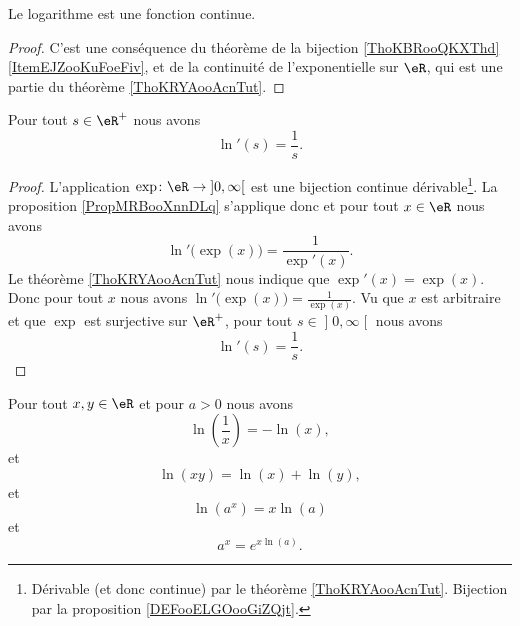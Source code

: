 \begin{lemma}        \label{LEMooCYGTooEjXEUu}
	Le logarithme est une fonction continue.
\end{lemma}

\begin{proof}
	C'est une conséquence du théorème de la bijection \ref{ThoKBRooQKXThd}\ref{ItemEJZooKuFoeFiv}, et de la continuité de l'exponentielle sur \( \eR\), qui est une partie du théorème \ref{ThoKRYAooAcnTut}.
\end{proof}

\begin{proposition}      \label{PROPooPDJLooXphpEM}
	Pour tout \( s\in \eR^+\) nous avons
	\begin{equation}
		\ln'(s)=\frac{1}{ s }.
	\end{equation}
\end{proposition}

\begin{proof}
	L'application \( \exp\colon \eR\to \mathopen] 0 , \infty \mathclose[\) est une bijection continue dérivable\footnote{Dérivable (et donc continue) par le théorème \ref{ThoKRYAooAcnTut}. Bijection par la proposition \ref{DEFooELGOooGiZQjt}.}. La proposition \ref{PropMRBooXnnDLq} s'applique donc et pour tout \( x\in \eR\) nous avons
		\begin{equation}
			\ln'\big( \exp(x) \big)=\frac{1}{ \exp'(x) }.
		\end{equation}
		Le théorème \ref{ThoKRYAooAcnTut} nous indique que \( \exp'(x)=\exp(x)\). Donc pour tout \( x\) nous avons \( \ln'\big( \exp(x) \big)=\frac{1}{  \exp(x) }\). Vu que \( x\) est arbitraire et que \( \exp\) est surjective sur \( \eR^+\), pour tout \( s\in \mathopen] 0 , \infty \mathclose[\) nous avons
	\begin{equation}
		\ln'(s)=\frac{1}{ s }.
	\end{equation}
\end{proof}

\begin{proposition}      \label{PROPooLAOWooEYvXmI}
	Pour tout \( x,y\in \eR\) et pour \( a>0\) nous avons
	\begin{equation}
		\ln(\frac{1}{ x })=-\ln(x),
	\end{equation}
	et
	\begin{equation}        \label{EQooJVMUooVpUKyo}
		\ln(xy)=\ln(x)+\ln(y),
	\end{equation}
	et
	\begin{equation}        \label{EQooEJQSooWCczXy}
		\ln(a^x)=x\ln(a)
	\end{equation}
	et
	\begin{equation}
		a^x= e^{x\ln(a)}.
	\end{equation}
\end{proposition}

